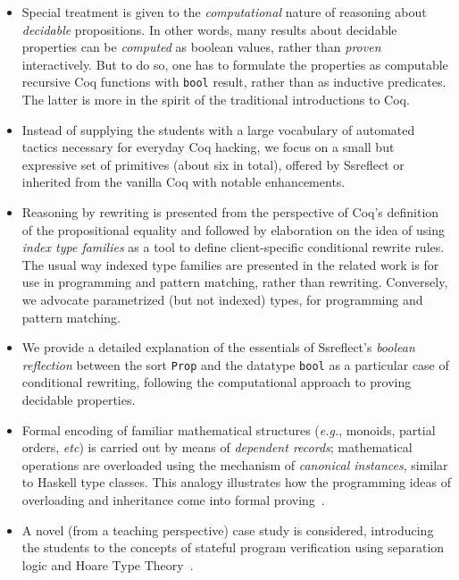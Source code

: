 \documentclass[blockstyle,preprint]{sigplanconf}
\newcommand{\an}[1]{\textcolor{red}{(Aleks: {#1})}}
\newcommand{\code}[1]{\lstinline{#1}}
\newcommand{\etc}{\emph{etc}}
\newcommand{\eg}{\emph{e.g.}\xspace}
\begin{document}
\begin{itemize}

\item Special treatment is given to the \emph{computational} nature of
  reasoning about \emph{decidable} propositions. In other words, many
  results about decidable properties can be \emph{computed} as boolean
  values, rather than \emph{proven} interactively. But to do so, one
  has to formulate the properties as computable recursive Coq
  functions with \code{bool} result, rather than as inductive
  predicates. The latter is more in the spirit of the traditional
  introductions to Coq.

\item Instead of supplying the students with a large vocabulary of
  automated tactics necessary for everyday Coq hacking, we focus on a
  small but expressive set of primitives (about six in total), offered
  by Ssreflect or inherited from the vanilla Coq with notable
  enhancements.

\item Reasoning by rewriting is presented from the perspective of
  Coq's definition of the propositional equality and followed by
  elaboration on the idea of using \emph{index type families} as a
  tool to define client-specific conditional rewrite rules. The usual
  way indexed type families are presented in the related work is for
  use in programming and pattern matching, rather than rewriting.
  Conversely, we advocate parametrized (but not indexed) types, for
  programming and pattern matching.

\item We provide a detailed explanation of the essentials of
  Ssreflect's \emph{boolean reflection} between the sort \code{Prop}
  and the datatype \code{bool} as a particular case of conditional
  rewriting, following the computational approach to proving decidable
  properties.

\item Formal encoding of familiar mathematical structures (\eg,
  monoids, partial orders, \etc) is carried out by means of
  \emph{dependent records}; mathematical operations are overloaded
  using the mechanism of \emph{canonical instances}, similar to
  Haskell type classes. This analogy illustrates how the programming
  ideas of overloading and inheritance come into formal
  proving~\cite{Garillot-al:TPHOL09}.
%

\item A novel (from a teaching perspective) case study is considered,
  introducing the students to the concepts of stateful program
  verification using separation logic and Hoare Type
  Theory~\cite{Nanevski-al:JFP08}.

\end{itemize}
\end{document}
